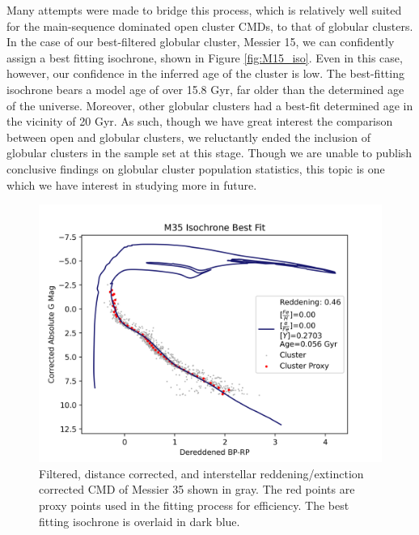 \documentclass[onecolumn,table,xcdraw,super]{aastex631}
\begin{document}
Many attempts were made to bridge this process, which is relatively well suited for the main-sequence dominated open cluster CMDs, to that of globular clusters. In the case of our best-filtered globular cluster, Messier 15, we can confidently assign a best fitting isochrone, shown in Figure \ref{fig:M15_iso}. Even in this case, however, our confidence in the inferred age of the cluster is low. The best-fitting isochrone bears a model age of over 15.8 Gyr, far older than the determined age of the universe. Moreover, other globular clusters had a best-fit determined age in the vicinity of 20 Gyr. As such, though we have great interest the comparison between open and globular clusters, we reluctantly ended the inclusion of globular clusters in the sample set at this stage. Though we are unable to publish conclusive findings on globular cluster population statistics, this topic is one which we have interest in studying more in future.

\begin{figure}[]
    \centering
      \includegraphics[width=4.75in]{figures/M35_CMD_Iso_BestFit.png}
    \caption{Filtered, distance corrected, and interstellar reddening/extinction corrected CMD of Messier 35 shown in gray. The red points are proxy points used in the fitting process for efficiency. The best fitting isochrone is overlaid in dark blue.}
    \label{fig:M35_iso}
\end{figure}
\end{document}
